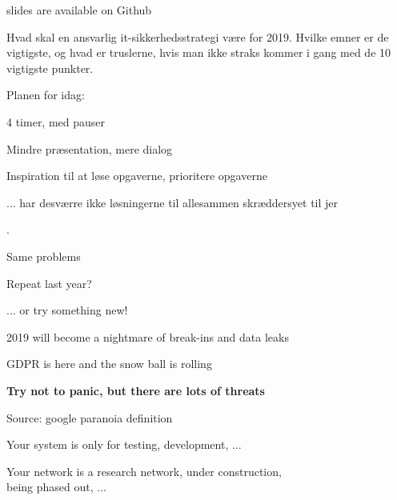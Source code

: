 \documentclass[Screen16to9,17pt]{foils}
\begin{document}


\vskip 1cm
\centerline{\footnotesize slides are available on Github}



Hvad skal en ansvarlig it-sikkerhedsstrategi være for 2019. Hvilke emner er de vigtigste, og hvad er truslerne, hvis man ikke straks kommer i gang med de 10 vigtigste punkter.



\begin{list2}
\item Planen for idag:
\item 4 timer, med pauser
\item Mindre præsentation, mere dialog
\item Inspiration til at løse opgaverne, prioritere opgaverne
\item ... har desværre ikke løsningerne til allesammen skræddersyet til jer
\end{list2}


.

\begin{list2}
\item Same problems
\item Repeat last year?
\item ... or try something new!
\item 2019 will become a nightmare of break-ins and data leaks
\item GDPR is here and the snow ball is rolling
\end{list2}

\vskip 1cm
{\LARGE\bf Try not to panic, but there are lots of threats}




Source: google paranoia definition




Your system is only for testing, development, ...

Your network is a research network, under construction, \\
being phased out, ...
\end{document}
